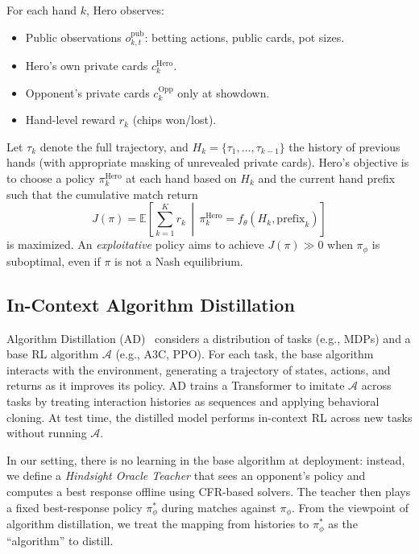\documentclass{article}
\begin{document}
For each hand $k$, Hero observes:
\begin{itemize}[leftmargin=*]
    \item Public observations $o^{\text{pub}}_{k,t}$: betting actions, public cards, pot sizes.
    \item Hero's own private cards $c^{\text{Hero}}_k$.
    \item Opponent's private cards $c^{\text{Opp}}_k$ only at showdown.
    \item Hand-level reward $r_k$ (chips won/lost).
\end{itemize}

Let $\tau_k$ denote the full trajectory, and $H_k = \{\tau_1,\dots,\tau_{k-1}\}$ the history of previous hands (with appropriate masking of unrevealed private cards). Hero's objective is to choose a policy $\pi^{\text{Hero}}_k$ at each hand based on $H_k$ and the current hand prefix such that the cumulative match return
\begin{equation}
    J(\pi) = \mathbb{E}\left[ \sum_{k=1}^{K} r_k \,\middle|\, \pi^{\text{Hero}}_k = f_{\theta}(H_k, \text{prefix}_{k}) \right]
\end{equation}
is maximized. An \emph{exploitative} policy aims to achieve $J(\pi) \gg 0$ when $\pi_{\phi}$ is suboptimal, even if $\pi$ is not a Nash equilibrium.

\subsection{In-Context Algorithm Distillation}

Algorithm Distillation (AD)~\citep{laskin2023context} considers a distribution of tasks (e.g., MDPs) and a base RL algorithm $\mathcal{A}$ (e.g., A3C, PPO). For each task, the base algorithm interacts with the environment, generating a trajectory of states, actions, and returns as it improves its policy. AD trains a Transformer to imitate $\mathcal{A}$ across tasks by treating interaction histories as sequences and applying behavioral cloning. At test time, the distilled model performs in-context RL across new tasks without running $\mathcal{A}$.

In our setting, there is no learning in the base algorithm at deployment: instead, we define a \emph{Hindsight Oracle Teacher} that sees an opponent's policy and computes a best response offline using CFR-based solvers. The teacher then plays a fixed best-response policy $\pi^*_{\phi}$ during matches against $\pi_{\phi}$. From the viewpoint of algorithm distillation, we treat the mapping from histories to $\pi^*_{\phi}$ as the ``algorithm'' to distill.
\end{document}
